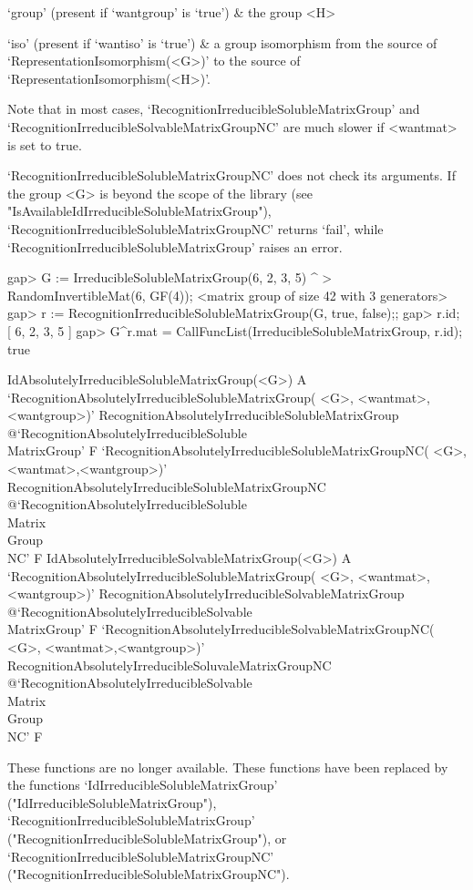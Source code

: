 `group' (present if `wantgroup' is `true') & the group <H> 

`iso' (present if `wantiso' is `true') & a group isomorphism from the source of
    `RepresentationIsomorphism(<G>)' to the source of `RepresentationIsomorphism(<H>)'.
    
\enditems
Note that in most cases, `Recog\-nition\-Irreducible\-Soluble\-Matrix\-Group' and 
`Recog\-nition\-Irreducible\-Sol\-vable\-Matrix\-Group\-NC' are 
much slower if <wantmat> is set to true.   

`RecognitionIrreducibleSolubleMatrixGroupNC' does not check its arguments. If
the group <G> is beyond the scope of the {\IRREDSOL} library (see "IsAvailableIdIrreducibleSolubleMatrixGroup"), `RecognitionIrreducibleSolubleMatrixGroupNC' returns `fail', while `RecognitionIrreducibleSolubleMatrixGroup' raises an error.

\beginexample
gap> G := IrreducibleSolubleMatrixGroup(6, 2, 3, 5) ^
>         RandomInvertibleMat(6, GF(4));
<matrix group of size 42 with 3 generators>
gap> r := RecognitionIrreducibleSolubleMatrixGroup(G, true, false);;
gap> r.id;
[ 6, 2, 3, 5 ]
gap> G^r.mat = CallFuncList(IrreducibleSolubleMatrixGroup, r.id);
true
\endexample


\>IdAbsolutelyIrreducibleSolubleMatrixGroup(<G>) A
\>`RecognitionAbsolutelyIrreducibleSolubleMatrixGroup(%
   <G>, <wantmat>, <wantgroup>)'%
{RecognitionAbsolutelyIrreducibleSolubleMatrixGroup}%
@{`RecognitionAbsolutelyIrreducibleSoluble\\MatrixGroup'} F
\>`RecognitionAbsolutelyIrreducibleSolubleMatrixGroupNC(%
   <G>, <wantmat>,<wantgroup>)'%
{RecognitionAbsolutelyIrreducibleSolubleMatrixGroupNC}%
@{`RecognitionAbsolutelyIrreducibleSoluble\\Matrix\\Group\\NC'} F
\>IdAbsolutelyIrreducibleSolvableMatrixGroup(<G>) A
\>`RecognitionAbsolutelyIrreducibleSolubleMatrixGroup(%
   <G>, <wantmat>, <wantgroup>)'%
{RecognitionAbsolutelyIrreducibleSolvableMatrixGroup}%
@{`RecognitionAbsolutelyIrreducibleSolvable\\MatrixGroup'} F
\>`RecognitionAbsolutelyIrreducibleSolvableMatrixGroupNC(%
   <G>, <wantmat>,<wantgroup>)'%
{RecognitionAbsolutelyIrreducibleSoluvaleMatrixGroupNC}%
@{`RecognitionAbsolutelyIrreducibleSolvable\\Matrix\\Group\\NC'} F

These functions are no longer available. These functions have been replaced by the
functions 
`IdIrreducibleSolubleMatrixGroup' ("IdIrreducibleSolubleMatrixGroup"), 
`RecognitionIrreducibleSolubleMatrixGroup' ("RecognitionIrreducibleSolubleMatrixGroup"), or
`Recognition\-Irre\-du\-ci\-bleSolubleMatrixGroupNC' ("RecognitionIrreducibleSolubleMatrixGroupNC").

